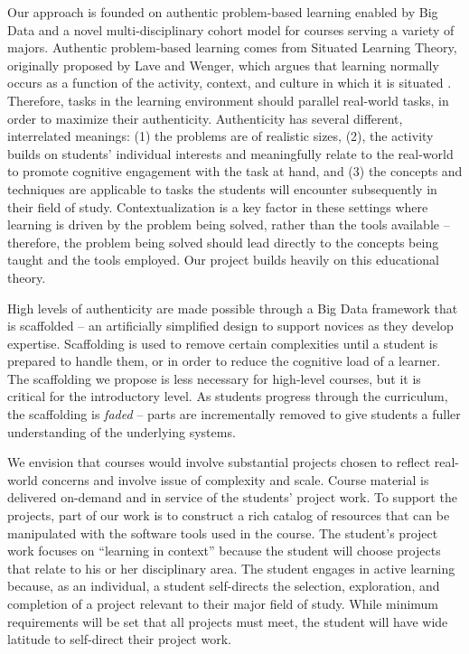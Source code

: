 \documentclass[11pt]{article}
\begin{document}
Our approach is founded on authentic problem-based learning enabled by Big Data and a novel multi-disciplinary cohort model for courses serving a variety of majors. Authentic problem-based learning comes from Situated Learning Theory, originally proposed by Lave and Wenger, which argues that learning normally occurs as a function of the activity, context, and culture in which it is situated \cite{lave-situated}. Therefore, tasks in the learning environment should parallel real-world tasks, in order to maximize their authenticity. Authenticity has several different, interrelated meanings: (1) the problems are of realistic sizes, (2), the activity builds on students' individual interests and meaningfully relate to the real-world to promote cognitive engagement with the task at hand, and (3) the concepts and techniques are applicable to tasks the students will encounter subsequently in their field of study. Contextualization is a key factor in these settings where learning is driven by the problem being solved, rather than the tools available \cite{heeter-comparison} -- therefore, the problem being solved should lead directly to the concepts being taught and the tools employed. Our project builds heavily on this educational theory.

High levels of authenticity are made possible through a Big Data framework that is scaffolded -- an artificially simplified design to support novices as they develop expertise. Scaffolding is used to remove certain complexities until a student is prepared to handle them, or in order to reduce the cognitive load of a learner. The scaffolding we propose is less necessary for high-level courses, but it is critical for the introductory level. As students progress through the curriculum, the scaffolding is \textit{faded} -- parts are incrementally removed to give students a fuller understanding of the underlying systems\cite{situated-cognition}.

We envision that courses would involve substantial projects chosen to reflect real-world concerns and involve issue of complexity and scale. Course material is delivered on-demand and in service of the students' project work. To support the projects, part of our work is to construct a rich catalog of resources that can be manipulated with the software tools used in the course. The student's project work focuses on ``learning in context'' because the student will choose projects that relate to his or her disciplinary area. The student engages in active learning because, as an individual, a student self-directs the selection, exploration, and completion of a project relevant to their major field of study. While minimum requirements will be set that all projects must meet, the student will have wide latitude to self-direct their project work. 
\end{document}
